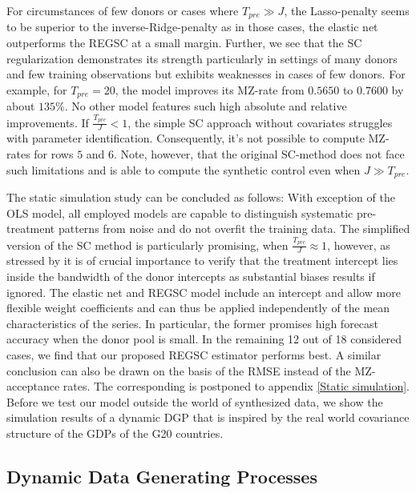 For circumstances of few donors or cases where $T_{pre} \gg J$, the Lasso-penalty seems to be superior to the inverse-Ridge-penalty as in those cases, the elastic net outperforms the \ac{REGSC} at a small margin. Further, we see that the \ac{SC} regularization demonstrates its strength particularly in settings of many donors and few training observations but exhibits weaknesses in cases of few donors. For example, for $T_{pre} = 20$, the model improves its \ac{MZ}-rate from $0.5650$ to $0.7600$ by about $135\%$. No other model features such high absolute and relative improvements. If $\frac{T_{pre}}{J} < 1$, the simple \ac{SC} approach without covariates struggles with parameter identification. Consequently, it's not possible to compute \ac{MZ}-rates for rows $5$ and $6$. Note, however, that the original \ac{SC}-method does not face such limitations and is able to compute the synthetic control even when $J \gg T_{pre}$. 

The static simulation study can be concluded as follows: With exception of the OLS model, all employed models are capable to distinguish systematic pre-treatment patterns from noise and do not overfit the training data. The simplified version of the \ac{SC} method is particularly promising, when $\frac{T_{pre}}{J} \approx 1$, however, as stressed by \cite{abadie:2010} it is of crucial importance to verify that the treatment intercept lies inside the bandwidth of the donor intercepts as substantial biases results if ignored. The elastic net and \ac{REGSC} model include an intercept and allow more flexible weight coefficients and can thus be applied independently of the mean characteristics of the series. In particular, the former promises high forecast accuracy when the donor pool is small. In the remaining 12 out of 18 considered cases, we find that our proposed \ac{REGSC} estimator performs best. A similar conclusion can also be drawn on the basis of the \ac{RMSE} instead of the \ac{MZ}-acceptance rates. The corresponding is postponed to appendix \ref{Static simulation}. Before we test our model outside the world of synthesized data, we show the simulation results of a dynamic \ac{DGP} that is inspired by the real world covariance structure of the \ac{GDP}s of the G20 countries.


\subsection{Dynamic Data Generating Processes}